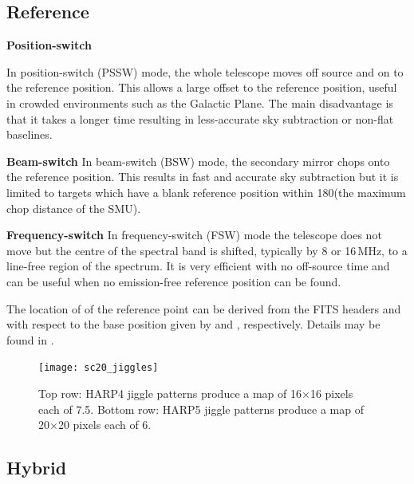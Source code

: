 \documentclass[11pt,oneside,chapters]{starlink}
\newcommand{\uarcs}{\hspace{-0.27em}\arcsec\hspace{-0.07em}}
\newcommand{\uarcs}{$''$}
\begin{document}
\subsection{Reference}
\label{sec:reference_mode}

\begin{aligndesc}
\item[\textbf{Position-switch}]

In position-switch (PSSW) mode, the whole telescope moves off source
and on to the reference position. This allows a large offset to the
reference position, useful in crowded environments such as the Galactic
Plane. The main disadvantage is that it takes a longer time resulting
in less-accurate sky subtraction or non-flat baselines.

\item[\textbf{Beam-switch}]
In beam-switch (BSW) mode, the secondary mirror chops onto the reference
position. This results in fast and accurate sky subtraction but it is
limited to targets which have a blank reference position within
180\arcsec (the maximum chop distance of the SMU).

\item[\textbf{Frequency-switch}]
In frequency-switch (FSW) mode the telescope does not move but the
centre of the spectral band is shifted, typically by 8 or 16\,MHz,
to a line-free region of the spectrum. It is very efficient with no
off-source time and can be
useful when no emission-free reference position can be found.
\end{aligndesc}

\begin{tip}
The location of of the reference point can be derived from the FITS headers
 and  with respect to the base position
given by  and , respectively.  Details
may be found in .
\end{tip}

\begin{figure}[b!]
\begin{center}
\texttt{[image: sc20\_jiggles]}
\caption[HARP4 and HARP5 jiggle patterns]{\label{fig:jiggle}
  Top row: HARP4 jiggle patterns produce a map of 16$\times$16 pixels
  each of 7.\uarcs5. Bottom row: HARP5 jiggle patterns produce a map of
  20$\times$20 pixels each of 6\arcsec. }
\end{center}
\end{figure}

\subsection{Hybrid}
\label{sec:hybrid}
\end{document}
